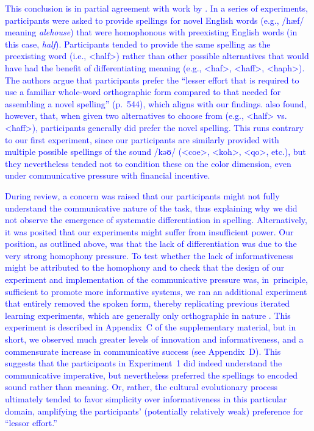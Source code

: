 \documentclass[doc,biblatex]{apa7}
\newcommand\newmaterial[1]{\textcolor{blue}{#1}}
\begin{document}
\newmaterial{This conclusion is in partial agreement with work by \textcite{Treiman:2015}. In a series of experiments, participants were asked to provide spellings for novel English words (e.g., /hæf/ meaning \textit{alehouse}) that were homophonous with preexisting English words (in this case, \textit{half}). Participants tended to provide the same spelling as the preexisting word (i.e., <half>) rather than other possible alternatives that would have had the benefit of differentiating meaning (e.g., <haf>, <haff>, <haph>). The authors argue that participants prefer the ``lesser effort that is required to use a familiar whole-word orthographic form compared to that needed for assembling a novel spelling'' (p.~544), which aligns with our findings. \textcite{Treiman:2015} also found, however, that, when given two alternatives to choose from (e.g., <half> vs.\@ <haff>), participants generally did prefer the novel spelling. This runs contrary to our first experiment, since our participants are similarly provided with multiple possible spellings of the sound /kəʊ/ (<coe>, <koh>, <qo>, etc.), but they nevertheless tended not to condition these on the color dimension, even under communicative pressure with financial incentive.}

\newmaterial{During review, a concern was raised that our participants might not fully understand the communicative nature of the task, thus explaining why we did not observe the emergence of systematic differentiation in spelling. Alternatively, it was posited that our experiments might suffer from insufficient power. Our position, as outlined above, was that the lack of differentiation was due to the very strong homophony pressure. To test whether the lack of informativeness might be attributed to the homophony and to check that the design of our experiment and implementation of the communicative pressure was, in~principle, sufficient to promote more informative systems, we ran an additional experiment that entirely removed the spoken form, thereby replicating previous iterated learning experiments, which are generally only orthographic in nature \parencite[e.g.,][]{Kirby:2008, Kirby:2015, Beckner:2017}. This experiment is described in Appendix~C of the supplementary material, but in short, we observed much greater levels of innovation and informativeness, and a commensurate increase in communicative success (see Appendix~D). This suggests that the participants in Experiment~1 did indeed understand the communicative imperative, but nevertheless preferred the spellings to encoded sound rather than meaning. Or, rather, the cultural evolutionary process ultimately tended to favor simplicity over informativeness in this particular domain, amplifying the participants' (potentially relatively weak) preference for ``lessor effort.''}
\end{document}
